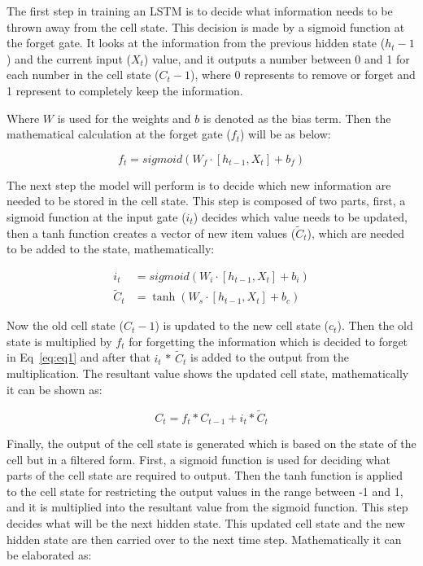 The first step in training an LSTM is to decide what information needs to be thrown away from the cell state.
This decision is made by a sigmoid function at the forget gate.
It looks at the information from the previous hidden state ($h_t-1$) and the current input ($X_t$) value, and it outputs a number between 0 and 1 for each number in the cell state ($C_t-1$), where 0 represents to remove or forget and 1 represent to completely keep the information.

Where $W$ is used for the weights and $b$ is denoted as the bias term. 
Then the mathematical calculation at the forget gate ($f_t$) will be as below:

\begin{equation}
f_{t}=sigmoid\left(W_{f} \cdot\left[h_{t-1}, X_{t}\right]+b_{f}\right)
\label{eq:eq1}
\end{equation}

The next step the model will perform is to decide which new information are needed to be stored in the cell state.
This step is composed of two parts, first, a sigmoid function at the input gate ($i_t$) decides which value needs to be updated, then a tanh function creates a vector of new item values ($\tilde{C}_{t}$), which are needed to be added to the state, mathematically:

\begin{equation}
\begin{aligned}
i_{t} &=sigmoid\left(W_{i} \cdot\left[h_{t-1}, X_{t}\right]+b_{i}\right) \\
\tilde{C}_{t} &=\tanh \left(W_{s} \cdot\left[h_{t-1}, X_{t}\right]+b_{c}\right)
\end{aligned} \label{eq:eq2}
\end{equation}

Now the old cell state ($C_t-1$) is updated to the new cell state ($c_t$).
Then the old state is multiplied by $f_t$ for forgetting the information which is decided to forget in Eq~\ref{eq:eq1} and after that $i_{t}$ $*$ $\tilde{C}_{t}$ is added to the output from the multiplication.
The resultant value shows the updated cell state, mathematically it can be shown as: 

\begin{equation}
C_{t}=f_{t} * C_{t-1}+i_{t} * \tilde{C}_{t}
\label{eq:eq3}
\end{equation}
 
Finally, the output of the cell state is generated which is based on the state of the cell but in a filtered form.
First, a sigmoid function is used for deciding what parts of the cell state are required to output.
Then the tanh function is applied to the cell state for restricting the output values in the range between -1 and 1, and it is multiplied into the resultant value from the sigmoid function.
This step decides what will be the next hidden state. 
This updated cell state and the new hidden state are then carried over to the next time step. Mathematically it can be elaborated as:

